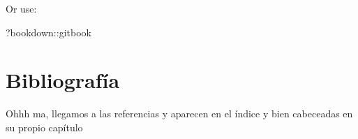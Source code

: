 \documentclass[
  12pt,
]{book}
\newenvironment{Shaded}{\begin{snugshade}}{\end{snugshade}}
\newcommand{\NormalTok}[1]{#1}
\newcommand{\SpecialCharTok}[1]{\textcolor[rgb]{0.00,0.00,0.00}{#1}}
\theoremstyle{definition}
\theoremstyle{definition}
\theoremstyle{definition}
\theoremstyle{definition}
\theoremstyle{remark}
\begin{document}
Or use:

\begin{Shaded}
\begin{Highlighting}[]
\NormalTok{?bookdown}\SpecialCharTok{::}\NormalTok{gitbook}
\end{Highlighting}
\end{Shaded}

\hypertarget{bibliografuxeda}{%
\chapter*{Bibliografía}\label{bibliografuxeda}}

Ohhh ma, llegamos a las referencias y aparecen en el índice y bien cabeceadas en su propio capítulo
\newline
\end{document}
